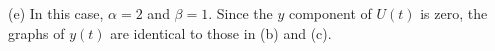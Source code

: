 \documentclass{ximera}
\begin{document}
\begin{exercise}
\begin{solution}
(e) In this case, $\alpha = 2$ and $\beta = 1$.  Since the $y$
component of $U(t)$ is zero, the graphs of $y(t)$ are identical
to those in (b) and (c).

\begin{figure}[htb]
                       \centerline{%
                       }
\end{figure}






\end{solution}
\end{exercise}
\end{document}
